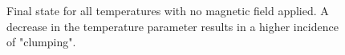 \documentclass{report}
\begin{document}
        \begin{figure}[!htb]
            \label{fig:Ising}
            \caption{Final state for all temperatures with no magnetic field applied.
            A decrease in the temperature parameter results in a higher incidence
            of "clumping".}
        \end{figure}
\end{document}
